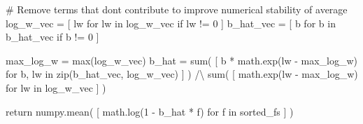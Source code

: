 \documentclass[
  letterpaper,
  DIV=11,
  numbers=noendperiod]{scrartcl}
\newenvironment{Shaded}{\begin{snugshade}}{\end{snugshade}}
\newcommand{\BuiltInTok}[1]{\textcolor[rgb]{0.00,0.23,0.31}{#1}}
\newcommand{\CommentTok}[1]{\textcolor[rgb]{0.37,0.37,0.37}{#1}}
\newcommand{\ControlFlowTok}[1]{\textcolor[rgb]{0.00,0.23,0.31}{#1}}
\newcommand{\DecValTok}[1]{\textcolor[rgb]{0.68,0.00,0.00}{#1}}
\newcommand{\KeywordTok}[1]{\textcolor[rgb]{0.00,0.23,0.31}{#1}}
\newcommand{\NormalTok}[1]{\textcolor[rgb]{0.00,0.23,0.31}{#1}}
\newcommand{\OperatorTok}[1]{\textcolor[rgb]{0.37,0.37,0.37}{#1}}
\begin{document}
\begin{Shaded}
\begin{Highlighting}[]
  \CommentTok{\# Remove terms that don\textquotesingle{}t contribute to improve numerical stability of average}
\NormalTok{  log\_w\_vec }\OperatorTok{=}\NormalTok{ [ lw }\ControlFlowTok{for}\NormalTok{ lw }\KeywordTok{in}\NormalTok{ log\_w\_vec }\ControlFlowTok{if}\NormalTok{ lw }\OperatorTok{!=} \DecValTok{0}\NormalTok{ ]}
\NormalTok{  b\_hat\_vec }\OperatorTok{=}\NormalTok{ [ b }\ControlFlowTok{for}\NormalTok{ b }\KeywordTok{in}\NormalTok{ b\_hat\_vec }\ControlFlowTok{if}\NormalTok{ b }\OperatorTok{!=} \DecValTok{0}\NormalTok{ ]}

\NormalTok{  max\_log\_w }\OperatorTok{=} \BuiltInTok{max}\NormalTok{(log\_w\_vec)}
\NormalTok{  b\_hat }\OperatorTok{=} \BuiltInTok{sum}\NormalTok{( [ b }\OperatorTok{*}\NormalTok{ math.exp(lw }\OperatorTok{{-}}\NormalTok{ max\_log\_w) }\ControlFlowTok{for}\NormalTok{ b, lw }\KeywordTok{in} \BuiltInTok{zip}\NormalTok{(b\_hat\_vec, log\_w\_vec) ] ) }\OperatorTok{/\textbackslash{}}
          \BuiltInTok{sum}\NormalTok{( [ math.exp(lw }\OperatorTok{{-}}\NormalTok{ max\_log\_w) }\ControlFlowTok{for}\NormalTok{ lw }\KeywordTok{in}\NormalTok{ log\_w\_vec ] )}

  \ControlFlowTok{return}\NormalTok{ numpy.mean( [ math.log(}\DecValTok{1} \OperatorTok{{-}}\NormalTok{ b\_hat }\OperatorTok{*}\NormalTok{ f) }\ControlFlowTok{for}\NormalTok{ f }\KeywordTok{in}\NormalTok{ sorted\_fs ] )}
\end{Highlighting}
\end{Shaded}
\end{document}
